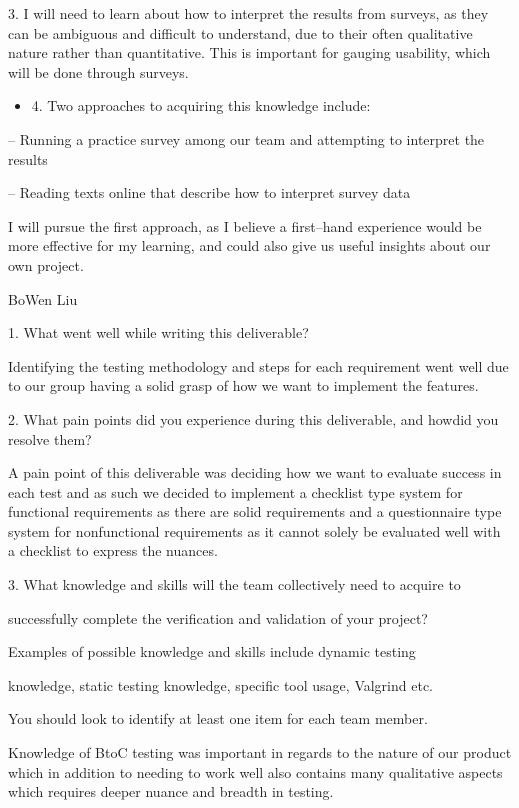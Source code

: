 \documentclass[12pt, titlepage]{article}
\begin{document}
3. I will need to learn about how to interpret the results from surveys, as they can be ambiguous and difficult to understand, due to their often qualitative nature rather than quantitative. This is important for gauging usability, which will be done through surveys.

\begin{itemize}
  \item 4. Two approaches to acquiring this knowledge include:
\end{itemize}

-- Running a practice survey among our team and attempting to interpret the results

-- Reading texts online that describe how to interpret survey data

I will pursue the first approach, as I believe a first--hand experience would be more effective for my learning, and could also give us useful insights about our own project.

BoWen Liu

1. What went well while writing this deliverable?

Identifying the testing methodology and steps for each requirement went well due to our group having a solid grasp of how we want to implement the features.

2. What pain points did you experience during this deliverable, and howdid you resolve them?

A pain point of this deliverable was deciding how we want to evaluate success in each test and as such we decided to implement a checklist type system for functional requirements as there are solid requirements and a questionnaire type system for nonfunctional requirements as it cannot solely be evaluated well with a checklist to express the nuances.

3. What knowledge and skills will the team collectively need to acquire to

successfully complete the verification and validation of your project?

Examples of possible knowledge and skills include dynamic testing

knowledge, static testing knowledge, specific tool usage, Valgrind etc.

You should look to identify at least one item for each team member.

Knowledge of BtoC testing was important in regards to the nature of our product which in addition to needing to work well also contains many qualitative aspects which requires deeper nuance and breadth in testing.
\end{document}
